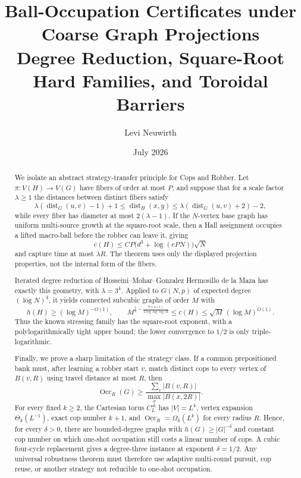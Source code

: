 \documentclass[11pt]{amsart}
\title[Ball-Occupation Certificates under Coarse Graph Projections]{Ball-Occupation Certificates under Coarse Graph Projections\\
Degree Reduction, Square-Root Hard Families, and Toroidal Barriers}
\author{Levi Neuwirth}
\date{July 2026}
\theoremstyle{definition}
\newcommand{\cnum}{c}
\newcommand{\dist}{\operatorname{dist}}
\newcommand{\Occ}{\operatorname{Occ}}
\begin{document}
\begin{abstract}
We isolate an abstract strategy-transfer principle for Cops and Robber.  Let
$\pi:V(H)\to V(G)$ have fibers of order at most $P$, and suppose that for a
scale factor $\lambda\ge1$ the distances between distinct fibers satisfy
\[
 \lambda(\dist_G(u,v)-1)+1
 \le \dist_H(x,y)
 \le \lambda(\dist_G(u,v)+2)-2,
\]
while every fiber has diameter at most $2(\lambda-1)$.  If the $N$-vertex
base graph has uniform multi-source growth at the square-root scale, then a
Hall assignment occupies a lifted macro-ball before the robber can leave it,
giving
\[
 \cnum(H)\le C P\bigl(d^3+\log(ePN)\bigr)\sqrt N
\]
and capture time at most $\lambda R$.  The theorem uses only the displayed
projection properties, not the internal form of the fibers.

Iterated degree reduction of Hosseini--Mohar--Gonzalez Hermosillo de la Maza
has exactly this geometry, with $\lambda=3^k$.  Applied to
$G(N,p)$ of expected degree $(\log N)^4$, it yields connected subcubic graphs
of order $M$ with
\[
 h(H)\ge (\log M)^{-O(1)},
 \qquad
 M^{\frac12-\frac{9+o(1)}{2\log\log\log M}}
 \le \cnum(H)
 \le \sqrt M\,(\log M)^{O(1)}.
\]
Thus the known stressing family has the square-root exponent, with a
polylogarithmically tight upper bound; the lower convergence to $1/2$ is only
triple-logarithmic.

Finally, we prove a sharp limitation of the strategy class.  If a common
prepositioned bank must, after learning a robber start $v$, match distinct cops
to every vertex of $B(v,R)$ using travel distance at most $R$, then
\[
 \Occ_R(G)
 \ge
 \frac{\sum_v |B(v,R)|}{\max_x |B(x,2R)|}.
\]
For every fixed $k\ge2$, the Cartesian torus $C_L^{\square k}$ has
$|V|=L^k$, vertex expansion $\Theta_k(L^{-1})$, exact cop number $k+1$, and
$\Occ_R=\Omega_k(L^k)$ for every radius $R$.  Hence, for every $\delta>0$,
there are bounded-degree graphs with $h(G)\ge |G|^{-\delta}$ and constant cop
number on which one-shot occupation still costs a linear number of cops.  A
cubic four-cycle replacement gives a degree-three instance at exponent
$\delta=1/2$.  Any universal robustness theorem must therefore use adaptive
multi-round pursuit, cop reuse, or another strategy not reducible to one-shot
occupation.
\end{abstract}

\maketitle
\end{document}
